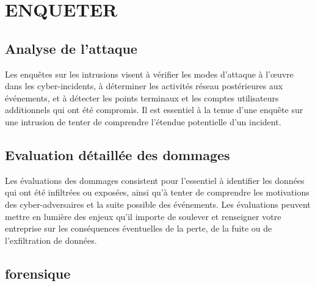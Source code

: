 %
%

\section{ENQUETER}
\subsection{Analyse de l'attaque}
Les enquêtes sur les intrusions visent à vérifier les modes d’attaque à l’œuvre dans les cyber-incidents, à déterminer les activités réseau postérieures aux événements, et à détecter les points terminaux et les comptes utilisateurs additionnels qui ont été compromis. Il est essentiel à la tenue d’une enquête sur une intrusion de tenter de comprendre l’étendue potentielle d’un incident.

\subsection{Evaluation détaillée des dommages}

Les évaluations des dommages consistent pour l’essentiel à identifier les données qui ont été infiltrées ou exposées, ainsi qu’à tenter de comprendre les motivations des cyber-adversaires et la suite possible des événements. Les évaluations peuvent mettre en lumière des enjeux qu’il importe de soulever et renseigner votre entreprise sur les conséquences éventuelles de la perte, de la fuite ou de l’exfiltration de données.




\subsection{forensique}

